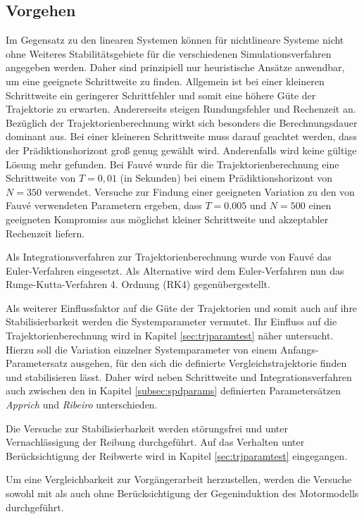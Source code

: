 \subsection{Vorgehen}

Im Gegensatz zu den linearen Systemen können für nichtlineare Systeme nicht ohne Weiteres Stabilitätsgebiete für die verschiedenen Simulationsverfahren angegeben werden. Daher sind prinzipiell nur heuristische Ansätze anwendbar, um eine geeignete Schrittweite zu finden. Allgemein ist bei einer kleineren Schrittweite ein geringerer Schrittfehler und somit eine höhere Güte der Trajektorie zu erwarten. Andererseits steigen Rundungsfehler und Rechenzeit an. Bezüglich der Trajektorienberechnung wirkt sich besonders die Berechnungsdauer dominant aus. Bei einer kleineren Schrittweite muss darauf geachtet werden, dass der Prädiktionshorizont groß genug gewählt wird. Anderenfalls wird keine gültige Lösung mehr gefunden. Bei Fauvé \cite{fauve} wurde für die Trajektorienberechnung eine Schrittweite von $T=0,01$ (in Sekunden) bei einem Prädiktionshorizont von $N=350$ verwendet. Versuche zur Findung einer geeigneten Variation zu den von Fauvé \cite{fauve} verwendeten Parametern ergeben, dass $T=0.005$ und $N=500$ einen geeigneten Kompromiss aus möglichst kleiner Schrittweite und akzeptabler Rechenzeit liefern. 

Als Integrationsverfahren zur Trajektorienberechnung wurde von Fauvé \cite{fauve} das Euler-Verfahren eingesetzt. Als Alternative wird dem Euler-Verfahren nun das Runge-Kutta-Verfahren 4. Ordnung (RK4) gegenübergestellt.

Als weiterer Einflussfaktor auf die Güte der Trajektorien und somit auch auf ihre Stabilisierbarkeit werden die Systemparameter vermutet. Ihr Einfluss auf die Trajektorienberechnung wird in Kapitel \ref{sec:trjparamtest} näher untersucht. Hierzu soll die Variation einzelner Systemparameter von einem Anfangs-Parametersatz ausgehen, für den sich die definierte Vergleichstrajektorie finden und stabilisieren lässt. Daher wird neben Schrittweite und Integrationsverfahren auch zwischen den in Kapitel \ref{subsec:spdparams} definierten Parametersätzen \textit{Apprich} und \textit{Ribeiro} unterschieden.

Die Versuche zur Stabilisierbarkeit werden störungsfrei und unter Vernachlässigung der Reibung durchgeführt. Auf das Verhalten unter Berücksichtigung der Reibwerte wird in Kapitel \ref{sec:trjparamtest} eingegangen. 

Um eine Vergleichbarkeit zur Vorgängerarbeit herzustellen, werden die Versuche sowohl mit als auch ohne Berücksichtigung der Gegeninduktion des Motormodells durchgeführt. 

